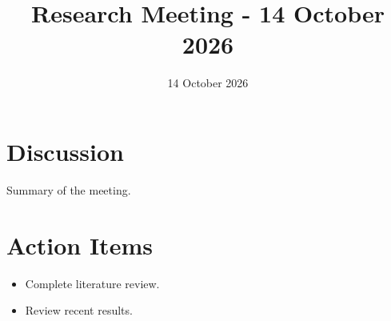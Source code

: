 \documentclass{article}
\title{Research Meeting - 14 October 2026}
\date{14 October 2026}
\begin{document}
\maketitle

\section{Discussion}
Summary of the meeting.

\section{Action Items}
\begin{itemize}
    \item Complete literature review.
    \item Review recent results.
\end{itemize}
\end{document}
